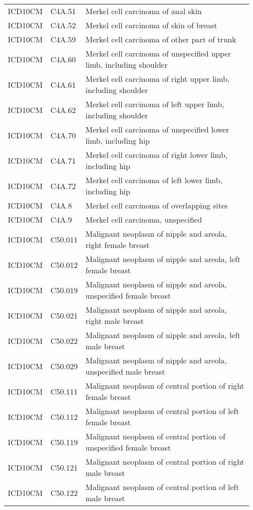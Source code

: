 \begin{longtable}{p{}p{}p{}}
  ICD10CM & C4A.51 & Merkel cell carcinoma of anal skin \\ 
  ICD10CM & C4A.52 & Merkel cell carcinoma of skin of breast \\ 
  ICD10CM & C4A.59 & Merkel cell carcinoma of other part of trunk \\ 
  ICD10CM & C4A.60 & Merkel cell carcinoma of unspecified upper limb, including shoulder \\ 
  ICD10CM & C4A.61 & Merkel cell carcinoma of right upper limb, including shoulder \\ 
  ICD10CM & C4A.62 & Merkel cell carcinoma of left upper limb, including shoulder \\ 
  ICD10CM & C4A.70 & Merkel cell carcinoma of unspecified lower limb, including hip \\ 
  ICD10CM & C4A.71 & Merkel cell carcinoma of right lower limb, including hip \\ 
  ICD10CM & C4A.72 & Merkel cell carcinoma of left lower limb, including hip \\ 
  ICD10CM & C4A.8 & Merkel cell carcinoma of overlapping sites \\ 
  ICD10CM & C4A.9 & Merkel cell carcinoma, unspecified \\ 
  ICD10CM & C50.011 & Malignant neoplasm of nipple and areola, right female breast \\ 
  ICD10CM & C50.012 & Malignant neoplasm of nipple and areola, left female breast \\ 
  ICD10CM & C50.019 & Malignant neoplasm of nipple and areola, unspecified female breast \\ 
  ICD10CM & C50.021 & Malignant neoplasm of nipple and areola, right male breast \\ 
  ICD10CM & C50.022 & Malignant neoplasm of nipple and areola, left male breast \\ 
  ICD10CM & C50.029 & Malignant neoplasm of nipple and areola, unspecified male breast \\ 
  ICD10CM & C50.111 & Malignant neoplasm of central portion of right female breast \\ 
  ICD10CM & C50.112 & Malignant neoplasm of central portion of left female breast \\ 
  ICD10CM & C50.119 & Malignant neoplasm of central portion of unspecified female breast \\ 
  ICD10CM & C50.121 & Malignant neoplasm of central portion of right male breast \\ 
  ICD10CM & C50.122 & Malignant neoplasm of central portion of left male breast \\ 

\end{longtable}
